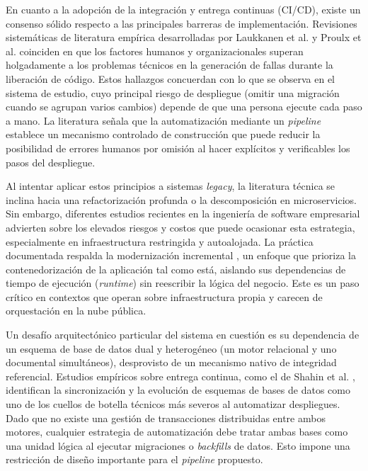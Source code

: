 En cuanto a la adopción de la integración y entrega continuas (CI/CD), existe un consenso sólido respecto a las principales barreras
de implementación. Revisiones sistemáticas de literatura empírica desarrolladas por Laukkanen et al. \cite{Laukkanen2017} y
Proulx et al. \cite{Proulx2018} coinciden en que los factores humanos y organizacionales superan holgadamente a los
problemas técnicos en la generación de fallas durante la liberación de código. Estos hallazgos concuerdan con lo que
se observa en el sistema de estudio, cuyo principal riesgo de despliegue (omitir una migración cuando se agrupan
varios cambios) depende de que una persona ejecute cada paso a mano.
La literatura señala que la automatización mediante un \emph{pipeline} establece un mecanismo controlado
de construcción que puede reducir la posibilidad de errores humanos por omisión al hacer explícitos y
verificables los pasos del despliegue.

Al intentar aplicar estos principios a sistemas \emph{legacy}, la literatura técnica se inclina hacia una refactorización
profunda o la descomposición en microservicios. Sin embargo, diferentes estudios recientes en la ingeniería
de software empresarial advierten sobre los elevados riesgos y costos que puede ocasionar esta estrategia,
especialmente en infraestructura restringida y autoalojada. La práctica documentada respalda la modernización
incremental \cite{Kosinska2020}, un enfoque que prioriza la contenedorización de la aplicación tal como está,
aislando sus dependencias de tiempo de ejecución (\emph{runtime}) sin reescribir la lógica
del negocio. Este es un paso crítico en contextos que operan sobre infraestructura propia y carecen de
orquestación en la nube pública.

Un desafío arquitectónico particular del sistema en cuestión es su dependencia de un esquema de base de datos dual
y heterogéneo (un motor relacional y uno documental simultáneos), desprovisto de un mecanismo nativo de integridad
referencial. Estudios empíricos sobre entrega continua, como el de Shahin et al. \cite{Shahin2017}, identifican la
sincronización y la evolución de esquemas de bases de datos como uno de los cuellos de botella técnicos más severos
al automatizar despliegues. Dado que no existe una gestión de transacciones distribuidas entre ambos motores,
cualquier estrategia de automatización debe tratar ambas bases como una unidad lógica al ejecutar
migraciones o \emph{backfills} de datos. Esto impone una restricción de diseño importante para el \emph{pipeline} propuesto.

